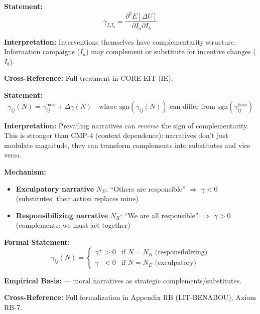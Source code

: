 \begin{tcolorbox}[colback=gray!5!white, colframe=gray!75!black,
    title=Axiom CMP-10: Intervention Complementarity]
\textbf{Statement:}
\begin{equation}
\gamma_{I_a I_b} = \frac{\partial^2 E[\Delta U]}{\partial I_a \partial I_b}
\end{equation}

\textbf{Interpretation:} Interventions themselves have complementarity structure.
Information campaigns ($I_a$) may complement or substitute for incentive changes ($I_b$).

\textbf{Cross-Reference:} Full treatment in CORE-EIT (IE).
\end{tcolorbox}

\begin{tcolorbox}[colback=gray!5!white, colframe=gray!75!black,
    title=Axiom CMP-11: Narrative Modulation of Complementarity]
\textbf{Statement:}
\begin{equation}
\gamma_{ij}(N) = \gamma_{ij}^{\text{base}} + \Delta\gamma(N) \quad \text{where } \text{sgn}(\gamma_{ij}(N)) \text{ can differ from } \text{sgn}(\gamma_{ij}^{\text{base}})
\end{equation}

\textbf{Interpretation:} Prevailing narratives can \emph{reverse} the sign of complementarity.
This is stronger than CMP-4 (context dependence): narratives don't just modulate magnitude,
they can transform complements into substitutes and vice versa.

\textbf{Mechanism:}
\begin{itemize}[nosep]
\item \textbf{Exculpatory narrative} $N_E$: ``Others are responsible'' $\Rightarrow$ $\gamma < 0$ (substitutes: their action replaces mine)
\item \textbf{Responsibilizing narrative} $N_R$: ``We are all responsible'' $\Rightarrow$ $\gamma > 0$ (complements: we must act together)
\end{itemize}

\textbf{Formal Statement:}
\begin{equation}
\gamma_{ij}(N) = \begin{cases}
\gamma^{+} > 0 & \text{if } N = N_R \text{ (responsibilizing)} \\
\gamma^{-} < 0 & \text{if } N = N_E \text{ (exculpatory)}
\end{cases}
\end{equation}

\textbf{Empirical Basis:} \citet{benabou2018narratives} --- moral narratives as strategic complements/substitutes.

\textbf{Cross-Reference:} Full formalization in Appendix RB (LIT-BENABOU), Axiom RB-7.
\end{tcolorbox}


